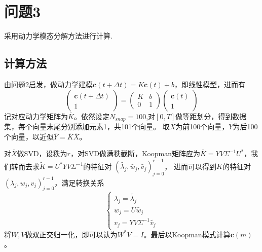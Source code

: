 \documentclass[11pt,a4 paper,one side]{article}
\begin{document}
\section{问题3}
采用动力学模态分解方法进行计算.
\subsection{计算方法}
由问题2启发，做动力学建模$\mathbf{c}(t+\Delta t) = K\mathbf{c}(t)+b$，即线性模型，进而有\begin{equation}
    \begin{pmatrix}
        \mathbf{c}(t+\Delta t)\\1
    \end{pmatrix}
    =
    \begin{pmatrix}
        K & b\\0 & 1
    \end{pmatrix}
    \begin{pmatrix}
        \mathbf{c}(t)\\1
    \end{pmatrix}
\end{equation}
记对应动力学矩阵为$\bar{K}$。依然设定$N_{snap}=100$,对$[0,T]$做等距划分，得到数据集，每个向量末尾分别添加元素1，共101个向量。
取$\bar{X}$为前100个向量，$\bar{Y}$为后100个向量，以近似$\bar{Y}=\bar{K}\bar{X}$。
\par 对$\bar{X}$做SVD，设秩为$r$，对SVD做满秩截断，Koopman矩阵应为$\bar{K}=YV\Sigma^{-1}U^*$，我们转而去求$\tilde{K}=U^{*}YV\Sigma^{-1}$的特征对
$(\tilde{\lambda_j},\tilde{w_j},\tilde{v_j})_{j=0}^{r-1}$，
进而可以得到$\bar{K}$的特征对$(\lambda_j,w_j,v_j)_{j=0}^{r-1}$，满足转换关系\begin{equation}
    \begin{cases}
        \lambda_j=\tilde{\lambda_j}\\
        w_j=U\tilde{w_j}\\
        v_j=YV\Sigma^{-1}\tilde{v_j}
    \end{cases}
\end{equation}
将$W,V$做双正交归一化，即可以认为$W^*V=I$。最后以Koopman模式计算$\mathbf{c}(m)$。
\end{document}

